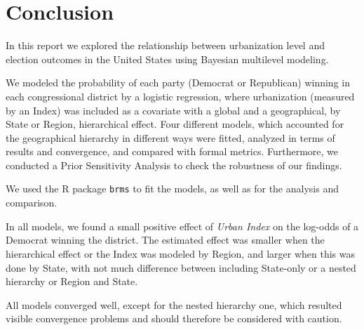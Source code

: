 \documentclass[12pt]{article}
\newcommand{\blue}[1]{\textcolor{blue}{#1}}
\begin{document}

\section{Conclusion}


In this report we explored the relationship between urbanization level and election outcomes in the United States using Bayesian multilevel modeling. 

We modeled the probability of each party (Democrat or Republican) winning in each congressional district by a logistic regression, where urbanization (measured by an Index) was included as a covariate with a global and a geographical, by State or Region, hierarchical effect. Four different models, which accounted for the geographical hierarchy in different ways were fitted, analyzed in terms of results and convergence, and compared with formal metrics. Furthermore, we conducted a Prior Sensitivity Analysis to check the robustness of our findings.

We used the R package \verb*|brms| to fit the models, as well as for the analysis and comparison.

In all models, we found a small positive effect of \textit{Urban Index} on the log-odds of a Democrat winning the district. The estimated effect was smaller when the hierarchical effect or the Index was modeled by Region, and larger when this was done by State, with not much difference between including State-only or a nested hierarchy or Region and State.

All models converged well, except for the nested hierarchy one, which resulted visible convergence problems and should therefore be considered with caution.
\end{document}
